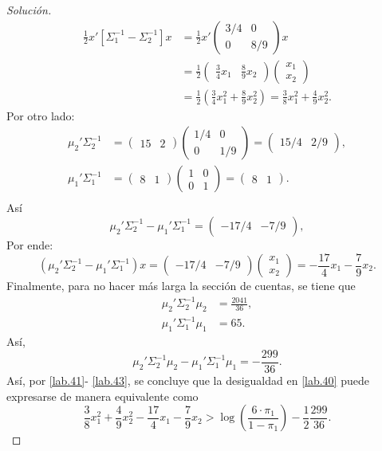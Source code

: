 \documentclass[10.5pt,notitlepage]{article}
\newenvironment{solucion}
  {\begin{proof}[Solución]}
  {\end{proof}}
\newcommand{\corch}[1]{\left[ #1 \right]}
\newcommand{\pare}[1]{\left( #1 \right)}
\newcommand{\Matrix}[1]{\begin{pmatrix} #1 \end{pmatrix}}
\theoremstyle{plain}
\begin{document}
\begin{solucion}
 \begin{align}
     \frac{1}{2}x'\corch{\Sigma_{1}^{-1} - \Sigma_{2}^{-1}}x &= \frac{1}{2}x'\Matrix{3/4 & 0 \\ 0 & 8/9}x \nonumber\\  
                                                             &= \frac{1}{2}\Matrix{\frac{3}{4}x_1 & \frac{8}{9}x_2}\Matrix{x_1 \\ x_2} \nonumber\\ 
                                                             &= \frac{1}{2}\pare{\frac{3}{4}x_{1}^2 + \frac{8}{9}x_{2}^2} = \frac{3}{8}x_{1}^{2}+ \frac{4}{9}x_{2}^2. \label{lab.42}
 \end{align}
Por otro lado: 
\begin{align*}
    \mu_{2}'\Sigma_{2}^{-1} &= \Matrix{15 & 2}\Matrix{1/4 & 0 \\ 0 & 1/9} = \Matrix{15/4 & 2/9},\\
    \mu_{1}'\Sigma_{1}^{-1} &= \Matrix{8 & 1}\Matrix{1 & 0 \\ 0 & 1} = \Matrix{8 & 1}.\\
\end{align*}
Así
\begin{equation*}
    \mu_{2}'\Sigma_{2}^{-1} -  \mu_{1}'\Sigma_{1}^{-1} = \Matrix{- 17/4 & -7/9}, 
\end{equation*}
Por ende:
\begin{equation}\label{lab.42}
     \pare{\mu_{2}'\Sigma_{2}^{-1} -  \mu_{1}'\Sigma_{1}^{-1}}x = \Matrix{- 17/4 & -7/9}\Matrix{x_1 \\ x_2} = -\frac{17}{4}x_1 - \frac{7}{9}x_{2}.
\end{equation}
Finalmente, para no hacer más larga la sección de cuentas, se tiene que
\begin{align*}
    \mu_2'\Sigma_{2}^{-1}\mu_{2} &= \frac{2041}{36},\\ 
     \mu_1'\Sigma_{1}^{-1}\mu_{1} &=65.  
\end{align*}
Así,
\begin{equation}\label{lab.43}
\mu_{2}'\Sigma_{2}^{-1}\mu_{2} -  \mu_1'\Sigma_{1}^{-1}\mu_{1}  = - \frac{299}{36}.    
\end{equation}
Así, por \eqref{lab.41}- \eqref{lab.43}, se concluye que la desigualdad en \eqref{lab.40} puede expresarse de manera equivalente como 
\begin{equation}\label{lab.50}
    \frac{3}{8}x_{1}^{2}+ \frac{4}{9}x_{2}^2 -\frac{17}{4}x_1 - \frac{7}{9}x_{2} > \log\pare{\frac{6\cdot\pi_{1}}{1 -\pi_{1}}} - \frac{1}{2}\frac{299}{36}.

\end{equation}
\end{solucion}
\end{document}
